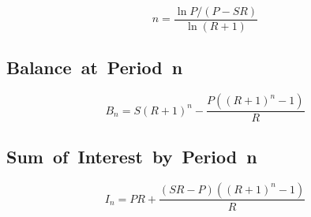 \documentclass[a4paper, 10pt]{article}
\begin{document}
\[
    n = \frac{ \ln P/(P - SR) }{ \ln(R + 1) }
\]


\subsection{Balance~at~Period~n}\label{subsec:balance-at-period-n}

\[
    B_{n} = S(R + 1)^{n} - \frac{P((R + 1)^{n} - 1)}{R}
\]


\subsection{Sum~of~Interest~by~Period~n}\label{subsec:sum-of-interest-by-period-n}

\[
    I_{n} = PR + \frac{(SR - P)((R + 1)^{n} - 1)}{R}
\]
\end{document}
